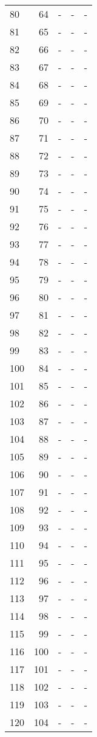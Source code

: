 \documentclass[10pt]{article}
\begin{document}
\begin {longtable}{l r r r r}
80 & 64 & - & - & - \\
81 & 65 & - & - & - \\
82 & 66 & - & - & - \\
83 & 67 & - & - & - \\
84 & 68 & - & - & - \\
85 & 69 & - & - & - \\
86 & 70 & - & - & - \\
87 & 71 & - & - & - \\
88 & 72 & - & - & - \\
89 & 73 & - & - & - \\
90 & 74 & - & - & - \\
91 & 75 & - & - & - \\
92 & 76 & - & - & - \\
93 & 77 & - & - & - \\
94 & 78 & - & - & - \\
95 & 79 & - & - & - \\
96 & 80 & - & - & - \\
97 & 81 & - & - & - \\
98 & 82 & - & - & - \\
99 & 83 & - & - & - \\
100 & 84 & - & - & - \\
101 & 85 & - & - & - \\
102 & 86 & - & - & - \\
103 & 87 & - & - & - \\
104 & 88 & - & - & - \\
105 & 89 & - & - & - \\
106 & 90 & - & - & - \\
107 & 91 & - & - & - \\
108 & 92 & - & - & - \\
109 & 93 & - & - & - \\
110 & 94 & - & - & - \\
111 & 95 & - & - & - \\
112 & 96 & - & - & - \\
113 & 97 & - & - & - \\
114 & 98 & - & - & - \\
115 & 99 & - & - & - \\
116 & 100 & - & - & - \\
117 & 101 & - & - & - \\
118 & 102 & - & - & - \\
119 & 103 & - & - & - \\
120 & 104 & - & - & - \\

\end{longtable}
\end{document}
